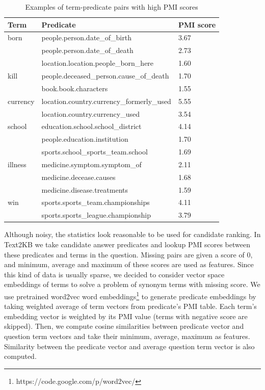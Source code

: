 \begin{table}
\caption{Examples of term-predicate pairs with high PMI scores}
\label{table:cqa_npmi}
\begin{tabular}{| p{1cm} | p{5.5cm} | p{0.75cm} |}
\hline
Term & Predicate & PMI score\\
\hline
born & people.person.date\_of\_birth & 3.67\\
 & people.person.date\_of\_death & 2.73\\
 & location.location.people\_born\_here & 1.60\\
\hline
kill & people.deceased\_person.cause\_of\_death & 1.70\\
& book.book.characters & 1.55\\
\hline
currency & location.country.currency\_formerly\_used & 5.55 \\
& location.country.currency\_used & 3.54 \\
\hline
school & education.school.school\_district & 4.14 \\
& people.education.institution & 1.70\\
& sports.school\_sports\_team.school & 1.69 \\
\hline
illness & medicine.symptom.symptom\_of & 2.11\\
& medicine.decease.causes & 1.68\\
& medicine.disease.treatments & 1.59\\
\hline
win & sports.sports\_team.championships & 4.11\\
& sports.sports\_league.championship & 3.79\\
\hline
\end{tabular}
\end{table}

Although noisy, the statistics look reasonable to be used for candidate ranking.
In Text2KB we take candidate answer predicates and lookup PMI scores between these predicates and terms in the question.
Missing pairs are given a score of 0, and minimum, average and maximum of these scores are used as features.
Since this kind of data is usually sparse, we decided to consider vector space embeddings of terms to solve a problem of synonym terms with missing score.
We use pretrained word2vec word embeddings\footnote{https://code.google.com/p/word2vec/} to generate predicate embeddings by taking weighted average of term vectors from predicate's PMI table.
Each term's embedding vector is weighted by its PMI value (terms with negative score are skipped).
Then, we compute cosine similarities between predicate vector and question term vectors and take their minimum, average, maximum as features.
Similarity between the predicate vector and average question term vector is also computed.


